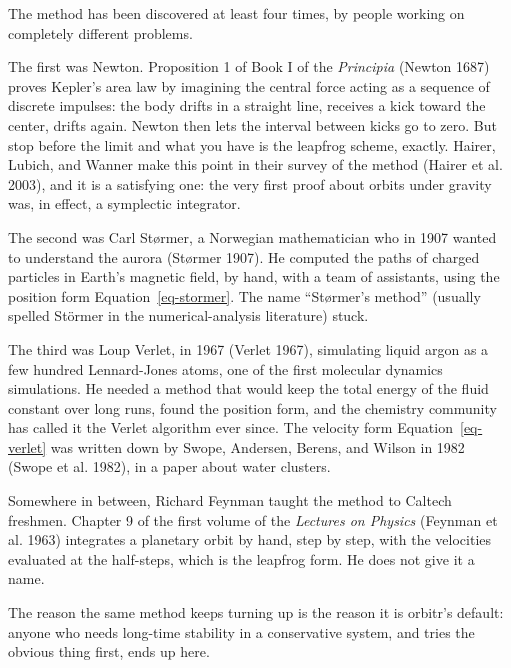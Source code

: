 \documentclass[
  10.5pt,
  letterpaper,
]{scrbook}
\theoremstyle{definition}
\theoremstyle{plain}
\theoremstyle{remark}
\begin{document}
\begin{tcolorbox}[enhanced jigsaw, arc=.35mm, bottomrule=.15mm, bottomtitle=1mm, breakable, colback=white, colbacktitle=quarto-callout-note-color!10!white, colframe=quarto-callout-note-color-frame, coltitle=black, left=2mm, leftrule=.75mm, opacityback=0, opacitybacktitle=0.6, rightrule=.15mm, title={Where it comes from}, titlerule=0mm, toprule=.15mm, toptitle=1mm]

The method has been discovered at least four times, by people working on
completely different problems.

The first was Newton. Proposition 1 of Book I of the \emph{Principia}
(Newton 1687) proves Kepler's area law by imagining the central force
acting as a sequence of discrete impulses: the body drifts in a straight
line, receives a kick toward the center, drifts again. Newton then lets
the interval between kicks go to zero. But stop before the limit and
what you have is the leapfrog scheme, exactly. Hairer, Lubich, and
Wanner make this point in their survey of the method (Hairer et al.
2003), and it is a satisfying one: the very first proof about orbits
under gravity was, in effect, a symplectic integrator.

The second was Carl Størmer, a Norwegian mathematician who in 1907
wanted to understand the aurora (Størmer 1907). He computed the paths of
charged particles in Earth's magnetic field, by hand, with a team of
assistants, using the position form Equation~\ref{eq-stormer}. The name
``Størmer's method'' (usually spelled Störmer in the numerical-analysis
literature) stuck.

The third was Loup Verlet, in 1967 (Verlet 1967), simulating liquid
argon as a few hundred Lennard-Jones atoms, one of the first molecular
dynamics simulations. He needed a method that would keep the total
energy of the fluid constant over long runs, found the position form,
and the chemistry community has called it the Verlet algorithm ever
since. The velocity form Equation~\ref{eq-verlet} was written down by
Swope, Andersen, Berens, and Wilson in 1982 (Swope et al. 1982), in a
paper about water clusters.

Somewhere in between, Richard Feynman taught the method to Caltech
freshmen. Chapter 9 of the first volume of the \emph{Lectures on
Physics} (Feynman et al. 1963) integrates a planetary orbit by hand,
step by step, with the velocities evaluated at the half-steps, which is
the leapfrog form. He does not give it a name.

The reason the same method keeps turning up is the reason it is orbitr's
default: anyone who needs long-time stability in a conservative system,
and tries the obvious thing first, ends up here.

\end{tcolorbox}
\end{document}
